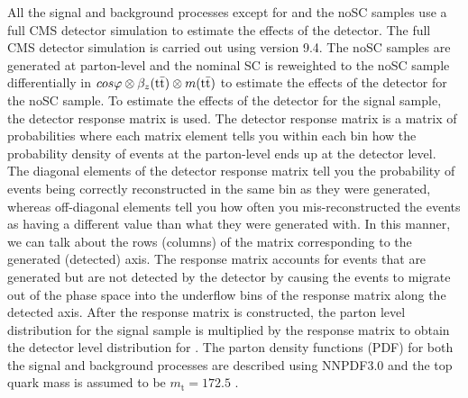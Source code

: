 All the signal and background processes except for \etat and the noSC samples use a full CMS detector simulation to estimate the effects of the detector. The full CMS detector simulation is carried out using \Geant version 9.4. The noSC samples are generated at parton-level and the nominal SC is reweighted to the noSC sample differentially in $cos \varphi \otimes \beta_z(\mathrm{t\bar{t}}) \otimes m(\mathrm{t\bar{t}})$ to estimate the effects of the detector for the noSC sample. To estimate the effects of the detector for the \etat signal sample, the \ttbar detector response matrix is used. The \ttbar detector response matrix is a matrix of probabilities where each matrix element tells you within each bin how the probability density of events at the parton-level ends up at the detector level. The diagonal elements of the detector response matrix tell you the probability of events being correctly reconstructed in the same bin as they were generated, whereas off-diagonal elements tell you how often you mis-reconstructed the events as having a different value than what they were generated with. In this manner, we can talk about the rows (columns) of the matrix corresponding to the generated (detected) axis. The response matrix accounts for events that are generated but are not detected by the detector by causing the events to migrate out of the phase space into the underflow bins of the response matrix along the detected axis. After the \ttbar response matrix is constructed, the parton level distribution for the \etat signal sample is multiplied by the response matrix to obtain the detector level distribution for \etat. The parton density functions (PDF) for both the signal and background processes are described using NNPDF3.0 and the top quark mass is assumed to be $m_\mathrm{t}=172.5$ \GeV.

